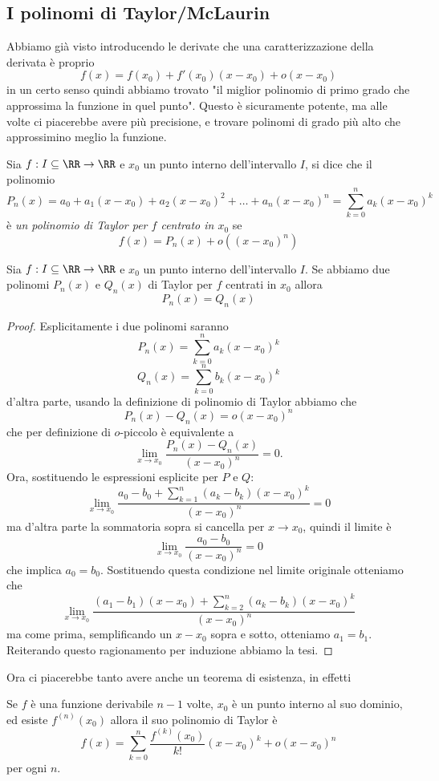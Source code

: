\documentclass[11pt]{scrartcl}
\begin{document}
	\subsection{I polinomi di Taylor/McLaurin}
	Abbiamo già visto introducendo le derivate che una caratterizzazione della derivata è proprio
	$$f(x)=f(x_0)+f'(x_0)(x-x_0)+o(x-x_0)$$
	in un certo senso quindi abbiamo trovato "il miglior polinomio di primo grado che approssima la funzione in quel punto". Questo è sicuramente potente, ma alle volte ci piacerebbe avere più precisione, e trovare polinomi di grado più alto che approssimino meglio la funzione. 
	\begin{definition}
		Sia $f:I\subseteq \RR \to \RR $ e $x_0$ un punto interno dell'intervallo $I$, si dice che il polinomio
		$$P_n(x)=a_0+a_1(x-x_0)+a_2(x-x_0)^2+\dots+a_n(x-x_0)^n=\sum_{k=0}^n a_k(x-x_0)^k$$
		è \textit{un polinomio di Taylor per $f$ centrato in $x_0$} se 
		$$f(x)=P_n(x)+o\left((x-x_0)^n\right)$$
	\end{definition}
	\begin{theorem}
		Sia $f:I\subseteq \RR \to \RR $ e $x_0$ un punto interno dell'intervallo $I$. Se abbiamo due polinomi $P_n(x)$ e $Q_n(x)$ di Taylor per $f$ centrati in $x_0$ allora
		$$P_n(x)=Q_n(x)$$
	\end{theorem}
	\begin{proof}
		Esplicitamente i due polinomi saranno
		$$P_n(x)=\sum_{k=0}^n a_k(x-x_0)^k$$
		$$Q_n(x)=\sum_{k=0}^n b_k(x-x_0)^k$$
		d'altra parte, usando la definizione di polinomio di Taylor abbiamo che 
		$$P_n(x)-Q_n(x)=o(x-x_0)^n$$
		che per definizione di $o$-piccolo è equivalente a 
		$$\lim_{x\to x_0}\frac{P_n(x)-Q_n(x)}{(x-x_0)^n}=0.$$
		Ora, sostituendo le espressioni esplicite per $P$ e $Q$:
		$$\lim_{x\to x_0}\frac{a_0-b_0+\sum_{k=1}^n (a_k-b_k)(x-x_0)^k}{(x-x_0)^n}=0$$
		ma d'altra parte la sommatoria sopra si cancella per $x\to x_0$, quindi il limite è
		$$\lim_{x\to x_0}\frac{a_0-b_0}{(x-x_0)^n}=0$$
		che implica $a_0=b_0$. Sostituendo questa condizione nel limite originale otteniamo che 
		$$\lim_{x\to x_0}\frac{(a_1-b_1)(x-x_0)+\sum_{k=2}^n (a_k-b_k)(x-x_0)^k}{(x-x_0)^n}$$
		ma come prima, semplificando un $x-x_0$ sopra e sotto, otteniamo $a_1=b_1$. Reiterando questo ragionamento per induzione abbiamo la tesi.
	\end{proof}
	Ora ci piacerebbe tanto avere anche un teorema di esistenza, in effetti
	\begin{theorem}[Taylor]
		Se $f$ è una funzione derivabile $n-1$ volte, $x_0$ è un punto interno al suo dominio, ed esiste $f^{(n)}(x_0)$ allora il suo polinomio di Taylor è
		$$f(x)=\sum_{k=0}^n\frac{f^{(k)}(x_0)}{k!}(x-x_0)^k+o(x-x_0)^n$$
		per ogni $n$.
	\end{theorem}
\end{document}
